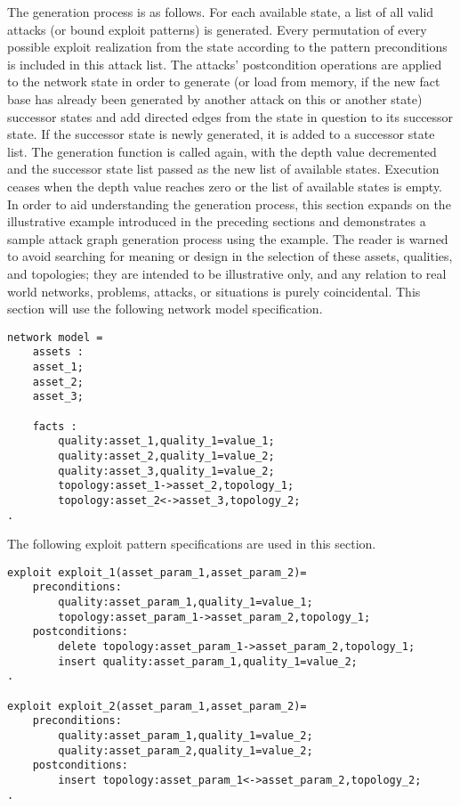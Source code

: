 The generation process is as follows. For each available state, a list of all valid 
attacks (or bound exploit patterns) is generated. 
Every permutation of every possible exploit realization from the state according to
the pattern preconditions is included in this attack list. The attacks' postcondition
operations are applied to the network state in order to generate (or load from memory, if
the new fact base has already been generated by another attack on this or another state)
successor states and add directed edges from the state in question to its successor state.
If the successor state is newly generated, it is added to a successor state list.
The generation function is called again, with the depth value decremented and the successor
state list passed as the new list of available states. Execution ceases when the depth
value reaches zero or the list of available states is empty.
In order to aid understanding the generation process, this section expands on the
illustrative example introduced in the preceding sections and demonstrates a
sample attack graph generation process using the example. The reader is warned to
avoid searching for meaning or design in the selection of these assets, qualities,
and topologies; they are intended to be illustrative only, and any relation to 
real world networks, problems, attacks, or situations is purely coincidental.
This section will use the following network model specification.
\begin{lstlisting}
network model = 
    assets :
    asset_1;
    asset_2;
    asset_3;

    facts :
        quality:asset_1,quality_1=value_1;
        quality:asset_2,quality_1=value_2;        
        quality:asset_3,quality_1=value_2;
        topology:asset_1->asset_2,topology_1;
        topology:asset_2<->asset_3,topology_2;
.
\end{lstlisting}

The following exploit pattern specifications are used in this section.
\begin{lstlisting}
exploit exploit_1(asset_param_1,asset_param_2)=
    preconditions:
        quality:asset_param_1,quality_1=value_1;
        topology:asset_param_1->asset_param_2,topology_1;
    postconditions:
        delete topology:asset_param_1->asset_param_2,topology_1;
        insert quality:asset_param_1,quality_1=value_2;
.

exploit exploit_2(asset_param_1,asset_param_2)=
    preconditions:
        quality:asset_param_1,quality_1=value_2;
        quality:asset_param_2,quality_1=value_2;
    postconditions:
        insert topology:asset_param_1<->asset_param_2,topology_2;
.
\end{lstlisting}

